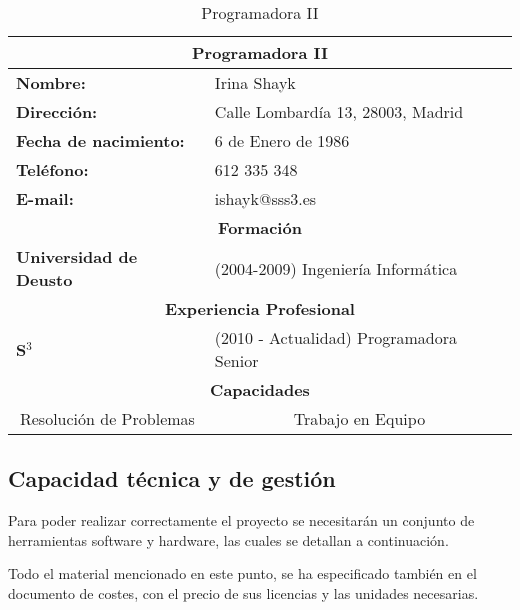 \begin{table}[H]
\begin{center}
\begin{tabular}{p{} p{9cm}}
\multicolumn{2}{c}{\Large{\textbf{Programadora II}}} \\
\hline
\textbf{Nombre:} & Irina Shayk\\
\textbf{Dirección:} & Calle Lombardía 13, 28003, Madrid\\
\textbf{Fecha de nacimiento:} & 6 de Enero de 1986 \\
\textbf{Teléfono:} & 612 335 348\\
\textbf{E-mail:} & ishayk@sss3.es\\
\hline \hline
\multicolumn{2}{c}{\textbf{Formación} } \\
\hline
\textbf{Universidad de Deusto} &  (2004-2009) Ingeniería Informática\\
\hline \hline
\multicolumn{2}{c}{\textbf{Experiencia Profesional} } \\
\hline
\textbf{S$^3$} & (2010 - Actualidad)  Programadora Senior\\
\hline \hline
\multicolumn{2}{c}{\textbf{Capacidades} } \\
\hline
\multicolumn{1}{c}{Resolución de Problemas} & \multicolumn{1}{c}{Trabajo en Equipo} \\
\hline
\end{tabular}
\caption{Programadora II}
\label{tab:programadoraII}
\end{center}
\end{table}


\subsection{Capacidad técnica y de gestión}
\par{Para poder realizar correctamente el proyecto se necesitarán un conjunto de herramientas software y hardware, las cuales se detallan a continuación. }
\par{Todo el material mencionado en este punto, se ha especificado también en el documento de costes, con el precio de sus licencias y las unidades necesarias.}


